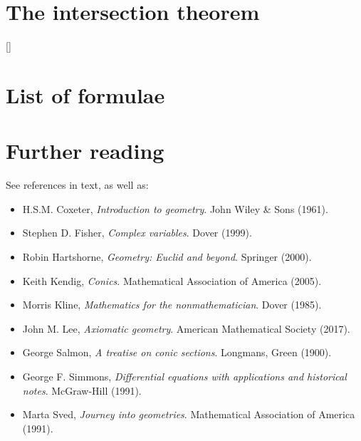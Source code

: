 \documentclass[a4paper,leqno,10pt]{article}
\theoremstyle{exercise}
\theoremstyle{plain}
\theoremstyle{definition}
\theoremstyle{remark}
\begin{document}
\section{The intersection theorem}

\appendix
{}[{\titlerule[0.8pt]}]
\section{List of formulae}

\section{Further reading}
See references in text, as well as:
\begin{itemize}
  \item H.S.M. Coxeter, \emph{Introduction to geometry}. John Wiley \& Sons (1961).
  \item Stephen D. Fisher, \emph{Complex variables}. Dover (1999).
  \item Robin Hartshorne, \emph{Geometry: Euclid and beyond}. Springer (2000).
  \item Keith Kendig, \emph{Conics}. Mathematical Association of America (2005).
  \item Morris Kline, \emph{Mathematics for the nonmathematician}. Dover (1985).
  \item John M. Lee, \emph{Axiomatic geometry}. American Mathematical Society (2017).
  \item George Salmon, \emph{A treatise on conic sections}. Longmans, Green (1900).
  \item George F. Simmons, \emph{Differential equations with applications and historical notes}. McGraw-Hill (1991).
  \item Marta Sved, \emph{Journey into geometries}. Mathematical Association of America (1991).
\end{itemize}
\end{document}
